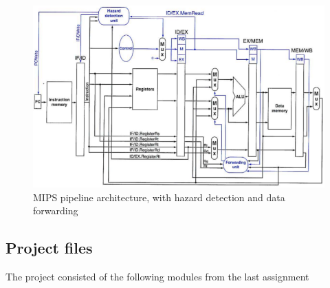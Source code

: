 \begin{figure}[!ht]
    \centering
        \includegraphics[width=1\textwidth]{figures/mips-pipeline}
        \caption{MIPS pipeline architecture, with hazard detection and data forwarding}
    \label{mips-architecture}
\end{figure}

\subsection{Project files}
The project consisted of the following modules from the last assignment

